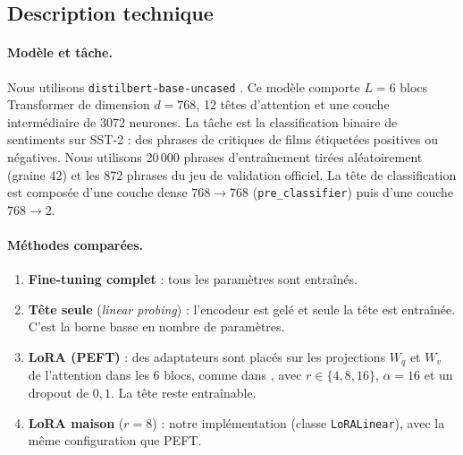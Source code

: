 \documentclass[11pt,a4paper]{article}
\begin{document}
\subsection{Description technique}
\paragraph{Modèle et tâche.} Nous utilisons \texttt{distilbert-base-uncased} \cite{sanh2019distilbert}. Ce modèle comporte $L=6$ blocs Transformer de dimension $d=768$, 12 têtes d'attention et une couche intermédiaire de 3072 neurones. La tâche est la classification binaire de sentiments sur SST-2 \cite{socher2013sst,wang2018glue} : des phrases de critiques de films étiquetées positives ou négatives. Nous utilisons 20\,000 phrases d'entraînement tirées aléatoirement (graine 42) et les 872 phrases du jeu de validation officiel. La tête de classification est composée d'une couche dense $768\to768$ (\texttt{pre\_classifier}) puis d'une couche $768\to2$.

\paragraph{Méthodes comparées.}
\begin{enumerate}
\item \textbf{Fine-tuning complet} : tous les paramètres sont entraînés.
\item \textbf{Tête seule} (\emph{linear probing}) : l'encodeur est gelé et seule la tête est entraînée. C'est la borne basse en nombre de paramètres.
\item \textbf{LoRA (PEFT)} : des adaptateurs sont placés sur les projections $W_q$ et $W_v$ de l'attention dans les 6 blocs, comme dans \cite{hu2021lora}, avec $r\in\{4,8,16\}$, $\alpha=16$ et un dropout de $0{,}1$. La tête reste entraînable.
\item \textbf{LoRA maison} ($r=8$) : notre implémentation (classe \texttt{LoRALinear}), avec la même configuration que PEFT.
\end{enumerate}
\end{document}
